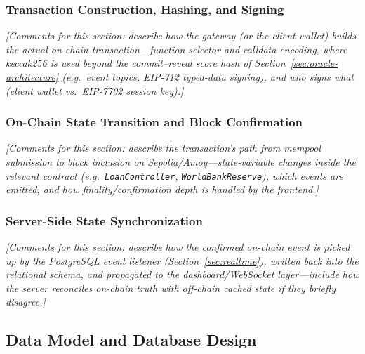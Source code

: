 \documentclass[12pt,a4paper]{report}
\begin{document}
\subsubsection{Transaction Construction, Hashing, and Signing}
\label{sec:tx-construction-hashing}

\vspace{1.5cm}
\noindent\textit{[Comments for this section: describe how the gateway (or the client wallet) builds the actual on-chain transaction---function selector and calldata encoding, where keccak256 is used beyond the commit--reveal score hash of Section~\ref{sec:oracle-architecture} (e.g.\ event topics, EIP-712 typed-data signing), and who signs what (client wallet vs.\ EIP-7702 session key).]}
\vspace{1.5cm}

\subsubsection{On-Chain State Transition and Block Confirmation}
\label{sec:onchain-state-transition}

\vspace{1.5cm}
\noindent\textit{[Comments for this section: describe the transaction's path from mempool submission to block inclusion on Sepolia/Amoy---state-variable changes inside the relevant contract (e.g.\ \texttt{LoanController}, \texttt{WorldBankReserve}), which events are emitted, and how finality/confirmation depth is handled by the frontend.]}
\vspace{1.5cm}

\subsubsection{Server-Side State Synchronization}
\label{sec:server-state-sync}

\vspace{1.5cm}
\noindent\textit{[Comments for this section: describe how the confirmed on-chain event is picked up by the PostgreSQL event listener (Section~\ref{sec:realtime}), written back into the relational schema, and propagated to the dashboard/WebSocket layer---include how the server reconciles on-chain truth with off-chain cached state if they briefly disagree.]}
\vspace{1.5cm}


\subsection{Data Model and Database Design}
\label{sec:data-model}
\end{document}
